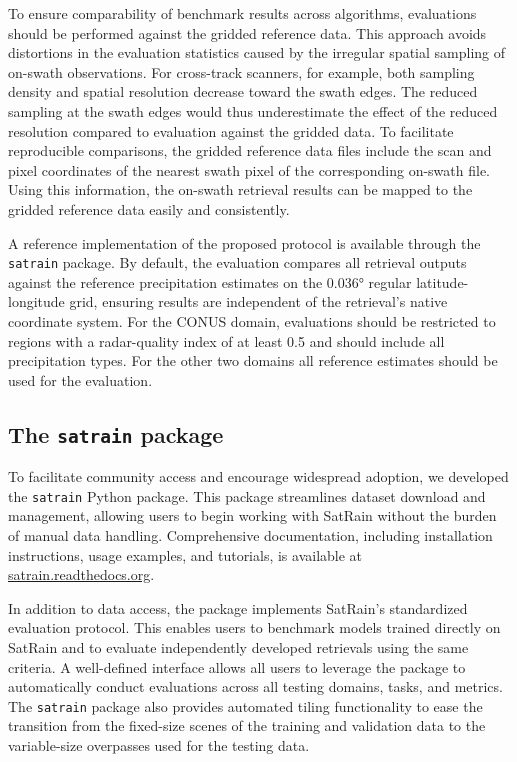 \documentclass[11pt]{article}
\begin{document}
To ensure comparability of benchmark results across algorithms, evaluations
should be performed against the gridded reference data. This approach avoids
distortions in the evaluation statistics caused by the irregular spatial
sampling of on-swath observations. For cross-track scanners, for example, both
sampling density and spatial resolution decrease toward the swath edges. The
reduced sampling at the swath edges would thus underestimate the effect of the
reduced resolution compared to evaluation against the gridded data. To
facilitate reproducible comparisons, the gridded reference data files include the scan
and pixel coordinates of the nearest swath pixel of the corresponding on-swath file.
Using this information, the on-swath retrieval results can be mapped to the gridded
reference data easily and consistently.

A reference implementation of the proposed protocol is available through the
\texttt{satrain} package. By default, the evaluation compares all retrieval
outputs against the reference precipitation estimates on the 0.036° regular
latitude-longitude grid, ensuring results are independent of the retrieval’s
native coordinate system. For the CONUS domain, evaluations should be restricted
to regions with a radar-quality index of at least 0.5 and should include all
precipitation types. For the other two domains all reference estimates should be
used for the evaluation.


\subsection{The \texttt{satrain} package}

To facilitate community access and encourage widespread adoption, we developed
the \texttt{satrain} Python package. This package streamlines dataset download
and management, allowing users to begin working with SatRain without the burden
of manual data handling. Comprehensive documentation, including installation
instructions, usage examples, and tutorials, is available at
\url{satrain.readthedocs.org}.

In addition to data access, the package implements SatRain’s standardized
evaluation protocol. This enables users to benchmark models trained directly on
SatRain and to evaluate independently developed retrievals using the same
criteria. A well-defined interface allows all users to leverage the package to
automatically conduct evaluations across all testing domains, tasks, and
metrics. The \texttt{satrain} package also provides automated tiling
functionality to ease the transition from the fixed-size scenes of the training
and validation data to the variable-size overpasses used for the testing data.
\end{document}
